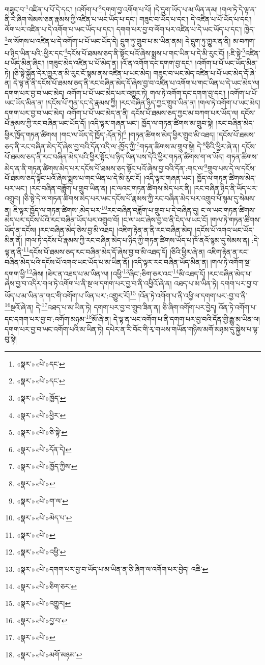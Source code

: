 གཟུང་བ་\footnote{«སྣར་»«པེ་»དང་}འཛིན་པ་པོ་དེ་དང་། །འགོག་པ་\footnote{«སྣར་»«པེ་»དང་}དགག་བྱ་འགོག་པ་པོ། །དེ་དྲུག་ཡོད་པ་མ་ཡིན་ནམ། །གལ་ཏེ་དེ་ལྟ་ན་ནི་རེ་ཞིག་སེམས་ཅན་རྣམས་ཀྱི་འཛིན་པ་ཡང་ཡོད་པ་དང་། གཟུང་བ་ཡོད་པ་དང་། དེ་འཛིན་པ་པོ་ཡོད་པ་དང་། ལོག་པར་འཛིན་པ་དེ་འགོག་པ་ཡང་ཡོད་པ་དང་། དགག་པར་བྱ་བ་ལོག་པར་འཛིན་པ་དེ་ཡང་ཡོད་པ་དང་། ཁྱེད་\footnote{«སྣར་»«པེ་»ཁྱོད་}ལ་སོགས་པ་འཛིན་པ་དེ་འགོག་པ་པོ་ཡང་ཡོད་དེ། དྲུག་ཏུ་གྲུབ་པ་མ་ཡིན་ནམ། དེ་དྲུག་ཏུ་གྱུར་ན་ནི། མ་བཀག་པ་ཉིད་ཡིན་པའི་:ཕྱིར་དང་\footnote{«སྣར་»«པེ་»ཕྱིར་}དངོས་པོ་ཐམས་ཅད་ནི་སྟོང་པའོ་ཞེས་སྨྲས་པ་གང་ཡིན་པ་དེ་མི་རུང་ངོ། །:ཇི་སྟེ་\footnote{«སྣར་»«པེ་»ཅི་སྟེ་}འཛིན་པ་ཡོད་མིན་ཞིང་། །གཟུང་མེད་འཛིན་པ་པོ་མེད་ན། །འོ་ན་འགོག་དང་དགག་བྱ་དང་། །འགོག་པ་པོ་ཡང་ཡོད་མིན་ཏེ། །ཅི་སྟེ་སྐྱོན་དེར་གྱུར་ན་མི་རུང་ངོ་སྙམ་ནས་འཛིན་པ་ཡང་མེད། གཟུང་བ་ཡང་མེད་འཛིན་པ་པོ་ཡང་མེད་དོ་ཞེ་ན། དེ་ལྟ་ན་ནི་དངོས་པོ་ཐམས་ཅད་ནི་རང་བཞིན་མེད་དོ་ཞེས་བྱ་བ་འཛིན་པ་འགོག་པ་གང་ཡིན་པ་དེ་ཡང་མེད་ལ། དགག་པར་བྱ་བ་ཡང་མེད། འགོག་པ་པོ་ཡང་མེད་པར་འགྱུར་ཏེ། གལ་ཏེ་འགོག་དང་དགག་བྱ་དང་། །འགོག་པ་པོ་ཡང་ཡོད་མིན་ན། །དངོས་པོ་ཀུན་དང་དེ་རྣམས་ཀྱི། །རང་བཞིན་ཉིད་ཀྱང་གྲུབ་ཡིན་ན། །གལ་ཏེ་འགོག་པ་ཡང་མེད། དགག་པར་བྱ་བ་ཡང་མེད། འགོག་པ་པོ་ཡང་མེད་ན་ནི། དངོས་པོ་ཐམས་ཅད་ཀྱང་མ་བཀག་པར་ཡོད་ལ། དངོས་པོ་རྣམས་ཀྱི་རང་བཞིན་ཡང་ཡོད་དོ། །འདི་ལྟར་གཞན་ཡང་། ཁྱོད་ལ་གཏན་ཚིགས་མ་གྲུབ་སྟེ། །རང་བཞིན་མེད་ཕྱིར་ཁྱོད་གཏན་ཚིགས། །གང་ལ་ཡོད་དེ་ཁྱོད་:དོན་ཏེ།\footnote{«སྣར་»«པེ་»དོན་དེ།} །གཏན་ཚིགས་མེད་ཕྱིར་གྲུབ་མི་འཐད། །དངོས་པོ་ཐམས་ཅད་ནི་རང་བཞིན་མེད་དོ་ཞེས་བྱ་བའི་དོན་འདི་ལ་:ཁྱོད་ཀྱི་\footnote{«སྣར་»«པེ་»ཁྱོད་ཀྱིས་}གཏན་ཚིགས་མ་གྲུབ་སྟེ། དེ་\footnote{«སྣར་»«པེ་»}ཅིའི་ཕྱིར་ཞེ་ན། དངོས་པོ་ཐམས་ཅད་ནི་རང་བཞིན་མེད་པའི་ཕྱིར་སྟོང་པ་ཉིད་ཡིན་པས་དེའི་ཕྱིར་གཏན་ཚིགས་ག་ལ་ཡོད། གཏན་ཚིགས་མེད་ན་ནི་གཏན་ཚིགས་མེད་པར་དངོས་པོ་ཐམས་ཅད་སྟོང་པའོ་ཞེས་བྱ་བའི་དོན་:གང་ལ་\footnote{«སྣར་»«པེ་»ག་ལ་}གྲུབ་པས་དེ་ལ་དངོས་པོ་ཐམས་ཅད་སྟོང་པའོ་ཞེས་སྨྲས་པ་གང་ཡིན་པ་དེ་མི་རུང་ངོ། །འདི་ལྟར་གཞན་ཡང་། ཁྱོད་ལ་གཏན་ཚིགས་མེད་པར་ཡང་། །རང་བཞིན་བཟློག་པ་གྲུབ་ཡིན་ན། །ང་ལའང་གཏན་ཚིགས་མེད་པར་ནི། །རང་བཞིན་ཉིད་ནི་ཡོད་པར་འགྲུབ། །ཅི་སྟེ་དེ་ལ་གཏན་ཚིགས་མེད་པར་ཡང་དངོས་པོ་རྣམས་ཀྱི་རང་བཞིན་མེད་པར་འགྲུབ་པོ་སྙམ་དུ་སེམས་ན། ཇི་ལྟར་ཁྱོད་ལ་གཏན་ཚིགས་:མེད་པར་\footnote{«སྣར་»«པེ་»མེད་པ་}རང་བཞིན་བཟློག་པ་གྲུབ་པ་དེ་བཞིན་དུ། ང་ལ་ཡང་གཏན་ཚིགས་མེད་པར་དངོས་པོའི་རང་བཞིན་ཡོད་པར་འགྲུབ་བོ། །ང་ལ་ཡང་ཞེས་བྱ་བ་ནི་ངེད་ལ་ཡང་ངོ། །གལ་ཏེ་གཏན་ཚིགས་ཡོད་ན་དངོས། །རང་བཞིན་མེད་ཅེས་བྱ་མི་འཐད། །འཇིག་རྟེན་ན་ནི་རང་བཞིན་མེད། །དངོས་པོ་འགའ་ཡང་ཡོད་མིན་ནོ། །གལ་ཏེ་དངོས་པོ་རྣམས་ཀྱི་རང་བཞིན་མེད་པ་ཉིད་ཀྱི་གཏན་ཚིགས་ཡོད་པ་ཁོ་ནའོ་སྙམ་དུ་སེམས་ན། :དེ་ལྟ་ན་ནི་\footnote{«སྣར་»«པེ་»}དངོས་པོ་ཐམས་ཅད་རང་བཞིན་མེད་དོ་ཞེས་བྱ་བ་མི་འཐད་དོ། །ཅིའི་ཕྱིར་ཞེ་ན། འཇིག་རྟེན་ན་རང་བཞིན་མེད་པའི་དངོས་པོ་འགའ་ཡང་ཡོད་པ་མ་ཡིན་ནོ། །འདི་ལྟར་རང་བཞིན་ཡོད་མིན་ན། །གལ་ཏེ་འགོག་སྔ་དགག་ཕྱི་\footnote{«སྣར་»«པེ་»འཕྱི་}ཞེས། །ཟེར་ན་འཐད་པ་མ་ཡིན་ལ། །འཕྱི་\footnote{«སྣར་»«པེ་»དགག་པར་བྱ་བ་ཡོད་པ་མ་ཡིན་ན་ཅི་ཞིག་ལ་འགོག་པར་བྱེད། འཆི་}ཞིང་:ཅིག་ཅར་འང་\footnote{«སྣར་»«པེ་»ཅིག་ཅར་}མི་འཐད་དོ། །རང་བཞིན་མེད་པ་ཞེས་བྱ་བ་འདིར་གལ་ཏེ་འགོག་པ་ནི་སྔ་ལ་དགག་པར་བྱ་བ་ནི་འཕྱིའོ་ཞེ་ན། འཐད་པ་མ་ཡིན་ཏེ། དགག་པར་བྱ་བ་ཡོད་པ་མ་ཡིན་ན་གང་གི་འགོག་པ་ཡིན་པར་:འགྱུར་རོ།\footnote{«སྣར་»«པེ་»འགྱུར།} །འོན་ཏེ་འགོག་པ་ནི་འཕྱི་ལ་དགག་པར་:བྱ་བ་ནི་\footnote{«སྣར་»«པེ་»བྱ་བ་}སྔའོ་ཞེ་ན། དེ་\footnote{«སྣར་»«པེ་»}འཐད་པ་མ་ཡིན་ཏེ། དགག་པར་བྱ་བ་གྲུབ་ཟིན་ན། ཅི་ཞིག་འགོག་པར་བྱེད། འོན་ཏེ་འགོག་པ་དང་དགག་པར་བྱ་བ་:འགོག་མཉམ་\footnote{«སྣར་»«པེ་»མགོ་མཉམ་}མོ་ཞེ་ན། དེ་ལྟ་ན་ཡང་འགོག་པ་ནི་དགག་པར་བྱ་བའི་དོན་གྱི་རྒྱུ་མ་ཡིན་ལ། དགག་པར་བྱ་བ་ཡང་འགོག་པའི་མ་ཡིན་ཏེ། དཔེར་ན་རི་བོང་གི་རྭ་གཡས་གཡོན་གཉིས་མགོ་མཉམ་དུ་སྐྱེས་པ་ལྟ་བུ་སྟེ། 